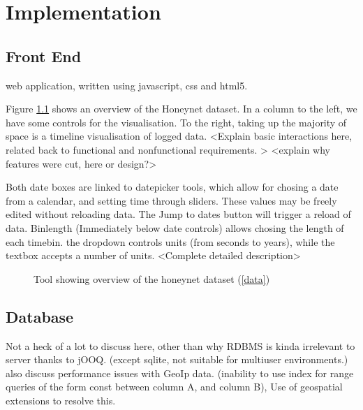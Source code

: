 \chapter{Implementation}\label{C:impl}

\section{Front End}  %

web application, written using javascript, css and html5.

Figure \ref{overview} shows an overview of the Honeynet dataset. In a column to the left, we have some controls for the visualisation. To the right, taking up the majority of space is a timeline visualisation of logged data.  
<Explain basic interactions here, related back to functional and nonfunctional requirements. >
<explain why features were cut, here or design?>

Both date boxes are linked to datepicker tools, which allow for chosing a date from a calendar, and setting time through sliders. These values may be freely edited without reloading data. The Jump to dates button will trigger a reload of data. 
Binlength (Immediately below date controls) allows chosing the length of each timebin. the dropdown controls units (from seconds to years), while the textbox accepts a number of units.
<Complete detailed description>
\begin{figure}[h!]
\caption{\protect\label{overview}Tool showing overview of the honeynet dataset (\ref{data})}
\end{figure}


\section{Database}
Not a heck of a lot to discuss here, other than why RDBMS is kinda irrelevant to server thanks to jOOQ. (except sqlite, not suitable for multiuser environments.)
also discuss performance issues with GeoIp data. (inability to use index for range queries of the form const between column A, and column B), Use of geospatial extensions to resolve this.

